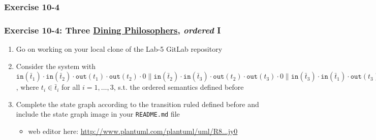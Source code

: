 \documentclass[presentation]{beamer}\mode<presentation>{\usetheme{AMSCesenaPurpleAndGold}}
\begin{document}
\subsubsection{Exercise 10-4}

\begin{frame}
\frametitle{Exercise 10-4: Three \href{https://en.wikipedia.org/wiki/Dining_philosophers_problem}{Dining Philosophers}, \emph{ordered} I}
    \begin{enumerate}
        \item Go on working on your local clone of the Lab-5 GitLab repository
        
        \vfill
        
        \item Consider the system with \alert{$\mathtt{in}(\bar{t}_1) \cdot \mathtt{in}(\bar{t}_2) \cdot \mathtt{out}(t_1) \cdot \mathtt{out}(t_2) \cdot 0 \parallel \mathtt{in}(\bar{t}_2) \cdot \mathtt{in}(\bar{t}_3) \cdot \mathtt{out}(t_2) \cdot \mathtt{out}(t_3) \cdot 0 \parallel \mathtt{in}(\bar{t}_3) \cdot \mathtt{in}(\bar{t}_1) \cdot \mathtt{out}(t_3) \cdot \mathtt{out}(t_1) \cdot 0 \parallel t_1 \cup t_2 \cup t_3$}, where $t_i \in \bar{t}_i$ for all $i = 1,\ldots,3$, s.t. the \alert{ordered} \linda{} semantics defined before
        
        \vfill
    
        \item Complete the state graph according to the transition ruled defined before and include the state graph image in your \alert{\texttt{README.md}} file
        \begin{itemize}
            \item web editor here: \href{
                http://www.plantuml.com/plantuml/uml/R8-nJiCm441tVyMDBLAhq15L4Q85YQLBnTHsiEAZM77ioBu00J4qOU17MFWMlg9VWXDgPAHiJtVlMRvBHznILIZcSgbBRda1IxpdbQ8ResajNn1cIRHS4oViLrGh14bSoSmDrojU82nCPILQzY050XObrI3GPLQM98rcKUcwf-6L0LpnBDzRKscnCChO-VnQ2wdtQGf6oKSSCfR8XJ9PxXsBOiYuq_XSUaBXdHgLCa_iZR7DsGucanHSmleFUBW0gKVq_Nvi3kDfm6OyDHMDo0y3TRDagm6E7vyGUG7RI0pKdfB_KHkYwFKeFuJeb7KZ3ryTD05QvfBVIyxx0_fkgpUtAm-xl-NifncpnuaO1g9mdrFu2F6_dOeRq4191otDtc0ZxasapDDujICB0ybEGVK4-kRDUxO9n2l4AuiUuWfnVPlWYpMBKUf6QuBTHmdjd301OfHCW9Xw9ZZpXtGS7mcOuFPHifG4YELkpYkBjMU2D-TNPBWNqyLJ7MRH1QXMp09KT_Exy056XCq8BJsWpGS2zo3RoPzVN_QneOVUWkDerO-VAn9t55CBjTlTXAaKP9KYceWxYwSLr29555DbVRlAn5sbNK5rSszNvNT7p767wtGfn2rVhr3TmX3eNREjUlJzCJvN9N8lpWKrI2g_3MPztR9uyKIfN2odNhkirRSmQubSlDvPBYmBhpbtuYN-quqv8g_2IbZsyy9_4HrRspHwS_lUNuoY5_lAd47cV5Hnjf-lniLuH_V0OnXqW4k6_-aRGJl3kAnnhO0hYeshYXFdPht6EQlPE2V03TyxXtq_QLpq-ZOCjD3tyByv1-CN5HzuBYdkRTQRkA8wSLKX7U3yBC2T-j3kVoATdZu-txTl_jy0
            }{http://www.plantuml.com/plantuml/uml/R8...jy0}
        \end{itemize}
        

\end{enumerate}
\end{frame}
\end{document}
